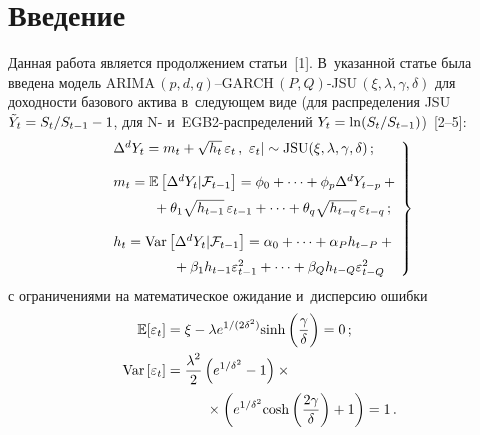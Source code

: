   



\thispagestyle{headings}

\begin{multicols}{2}

\label{st\stat}


\section{Введение}

Данная работа является продолжением \mbox{статьи}~[1]. В~указанной статье была 
введена модель  
ARIMA$\,(p,d,q)$--GARCH$\,(P,Q)$-JSU$\,(\xi,\lambda, \gamma,\delta)$ для 
доходности базового актива в~следующем виде (для распределения JSU 
$\tilde{Y}_t\hm= S_t/S_{t-1}\hm -1$, для N- и~EGB2-рас\-пре\-де\-ле\-ний 
$Y_t\hm= \ln(S_t/S_{t-1})$)~[2--5]:
\begin{equation}
\left.
\begin{array}{l}
\!\!\!\Delta^d Y_t=m_t +\sqrt{h_t}\,\varepsilon_t\,,\ \varepsilon_t\vert \sim 
\mathrm{JSU}(\xi,\lambda,\gamma,\delta)\,;\\[12pt]
\!\!\!m_t=\mathbb{E}\left[ \Delta^dY_t\vert \mathcal{F}_{t-1}\right]=
\phi_0+\cdots+\phi_p\Delta^d Y_{t-p} +{}\\[6pt]
\!\!\!\hspace*{10mm}{}+\theta_1\sqrt{h_{t-1}}\,\varepsilon_{t-1}+
\cdots+\theta_q \sqrt{h_{t-q}}\,\varepsilon_{t-q}\,;\\[12pt]
\!\!\!h_t=\mathrm{Var}\left[ \Delta^d Y_t\vert \mathcal{F}_{t-1}\right]=
\alpha_0+\cdots+\alpha_P h_{t-P} +{}\\[6pt]
\!\!\!\hspace*{15mm}{}+\beta_1h_{t-1}\varepsilon^2_{t-1}+\cdots+\beta_Q h_{t-Q} 
\varepsilon^2_{t-Q}
\end{array} \!\!
\right\} \!\!
\label{e1-dan}
\end{equation}
с ограничениями на математическое ожидание и~дисперсию ошибки
\begin{align*}
\mathbb{E}[\varepsilon_t] &=\xi-\lambda e^{1/(2\delta^2)}\mathrm{sinh}\left(
\fr{\gamma}{\delta}\right)=0\,;\\
\mathrm{Var}\left[\varepsilon_t\right]&=\fr{\lambda^2}{2}\left( e^{1/\delta^2}-1\right)\times{}\\
&\hspace*{10mm}{}\times \left( 
e^{1/\delta^2} \mathrm{cosh}\left( \fr{2\gamma}{\delta}\right) +1\right)=1\,.
\end{align*}


\end{multicols}
